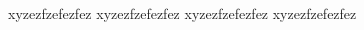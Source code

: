 \documentclass[final,t]{beamer} %
\newlength{\columnheight}
\begin{document}
\begin{frame}{}
\begin{columns}[T]
\begin{column}{0.48\textwidth}
{}
\end{column}
\end{columns}

\vspace*{-100cm}
xyzezfzefezfez xyzezfzefezfez xyzezfzefezfez xyzezfzefezfez 

\end{frame}
\end{document}
